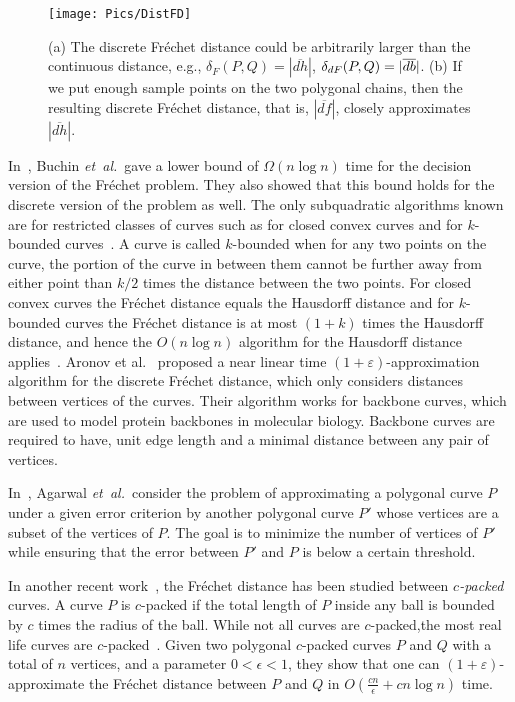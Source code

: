 \documentclass[12pt]{dalthesis}
\newcommand{\eps}{\varepsilon}
\newcommand{\etal}{{\em et~al.\/}}
\newcommand{\Frechet}{Fr\'echet }
\newcommand{\distF}{\delta_F}
\newcommand{\Ov}[1]{\overline{#1}}
\begin{document}
\begin{figure}[t]
	\centering
	\texttt{[image: Pics/DistFD]}
	\caption{ (a) The discrete \Frechet distance could be arbitrarily larger than the continuous distance, e.g., $\distF(P,Q) = |\Ov{dh}|$, $\distDisF(P,Q) = |\Ov{db}|$.  (b) If we
put enough sample points on the two polygonal chains, 
then the resulting discrete \Frechet
distance, that is, $|\Ov{df}|$, closely approximates $|\Ov{dh}|$.
}
	\label{fig:DistFig}
\end{figure}













In~\cite{LowerBound-FD}, Buchin \etal~gave a lower bound of $\Omega(n \log n)$ time for the decision version of the \Frechet problem.
They also showed that
this bound holds for 
the discrete version of the problem as well.
The only subquadratic algorithms known are for 
restricted classes of curves such as for closed
convex curves and for $k$-bounded curves~\cite{Alt2003Comparison}. 
A curve is
called $k$-bounded when
for any two points on the curve, 
the portion of the curve in between them cannot be further
away from either point than $k/2$ times the distance between the two points. For closed convex
curves the \Frechet distance equals the Hausdorff distance and for $k$-bounded curves the \Frechet
distance is at most $(1+k)$ times the Hausdorff distance, and hence the $O(n \log n)$ algorithm for
the Hausdorff distance applies~\cite{Alt2003Comparison}.
Aronov et al.~\cite{FDRevisited}  proposed a near linear time 
$(1+\eps)$-approximation algorithm for the
discrete \Frechet distance, which only considers distances between vertices of the curves. Their
algorithm works for backbone curves, which are used to model protein backbones in molecular
biology. Backbone curves are required to have, 
unit edge length and a minimal distance
between any pair of vertices. 


In~\cite{Agarwal2002}, Agarwal \etal~consider the problem of approximating a polygonal curve 
$P$ under a given error criterion by another polygonal curve $P'$ whose vertices are a subset of the vertices of $P$. 
The goal is to minimize the number of vertices of $P'$ while ensuring that the error between $P'$ and $P$ is 
below a certain threshold. 


In another recent work~\cite{c-packedFD},
the \Frechet distance has been studied between 
\emph{$c$-packed} curves. 
A curve $P$ is $c$-packed if the total length of $P$ inside any ball is bounded by $c$ times the radius of the ball. 
While not all curves are $c$-packed,the most real life curves are $c$-packed~\cite{c-packedFD}.
Given two polygonal $c$-packed curves $P$ and $Q$ 
with a total of $n$ vertices, and
a parameter $0 < \epsilon < 1$, 
they show that one can $(1+\eps)$-approximate the \Frechet distance between $P$ and $Q$ in
$O(\frac{cn}{\epsilon} + cn \log n)$ time.
\end{document}
